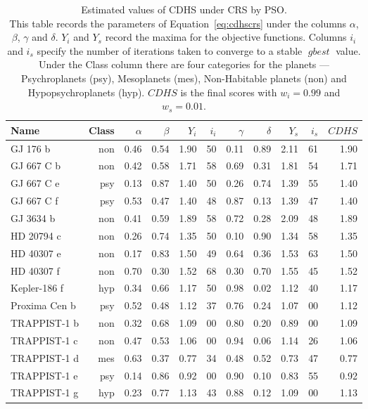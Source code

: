 \documentclass[10pt]{article}
\DeclareMathOperator*{\gbest}{\mathit{gbest}}
\begin{document}
\begin{table}
  \centering
  \begin{tabular}{l r r r r r r r r r r}
    \toprule
    Name & Class & $\alpha$ & $\beta$ & $\mathit{Y}_i$ & ${i}_i$ & 
    $\gamma$ & $\delta$ & $\mathit{Y}_s$ & ${i}_s$ & $\mathit{CDHS}$\\
    \midrule
    GJ 176 b & non & 0.46 & 0.54 & 1.90 & 50 & 0.11 & 0.89 & 2.11 & 61 & 1.90\\
    GJ 667 C b & non & 0.42 & 0.58 & 1.71 & 58 & 0.69 & 0.31 & 1.81 & 54 & 1.71\\
    GJ 667 C e & psy & 0.13 & 0.87 & 1.40 & 50 & 0.26 & 0.74 & 1.39 & 55 & 1.40\\
    GJ 667 C f & psy & 0.53 & 0.47 & 1.40 & 48 & 0.87 & 0.13 & 1.39 & 47 & 1.40\\
    GJ 3634 b & non & 0.41 & 0.59 & 1.89 & 58 & 0.72 & 0.28 & 2.09 & 48 & 1.89\\
    HD 20794 c & non & 0.26 & 0.74 & 1.35 & 50 & 0.10 & 0.90 & 1.34 & 58 & 1.35\\
    HD 40307 e & non & 0.17 & 0.83 & 1.50 & 49 & 0.64 & 0.36 & 1.53 & 63 & 1.50\\
    HD 40307 f & non & 0.70 & 0.30 & 1.52 & 68 & 0.30 & 0.70 & 1.55 & 45 & 1.52\\
    Kepler-186 f & hyp & 0.34 & 0.66 & 1.17 & 50 & 0.98 & 0.02 & 1.12 & 40 & 1.17\\
    Proxima Cen b & psy & 0.52 & 0.48 & 1.12 & 37 & 0.76 & 0.24 & 1.07 & 00 & 1.12\\
    TRAPPIST-1 b & non & 0.32 & 0.68 & 1.09 & 00 & 0.80 & 0.20 & 0.89 & 00 & 1.09\\
    TRAPPIST-1 c & non & 0.47 & 0.53 & 1.06 & 00 & 0.94 & 0.06 & 1.14 & 26 & 1.06\\
    TRAPPIST-1 d & mes & 0.63 & 0.37 & 0.77 & 34 & 0.48 & 0.52 & 0.73 & 47 & 0.77\\
    TRAPPIST-1 e & psy & 0.14 & 0.86 & 0.92 & 00 & 0.90 & 0.10 & 0.83 & 55 & 0.92\\
    TRAPPIST-1 g & hyp & 0.23 & 0.77 & 1.13 & 43 & 0.88 & 0.12 & 1.09 & 00 & 1.13\\
    \bottomrule
  \end{tabular}
  \caption{Estimated values of CDHS under CRS by PSO.\\
    \footnotesize This table records the parameters of Equation~\ref{eq:cdhscrs} under the columns
    $\alpha$, $\beta$, $\gamma$ and $\delta$. $Y_i$ and $Y_s$ record the maxima for the objective functions. Columns $i_i$
    and $i_s$ specify the number of iterations taken to converge to a stable $\gbest$ value. Under the Class column
    there are four categories for the planets --- Psychroplanets (psy), Mesoplanets (mes), Non-Habitable planets (non)
    and Hypopsychroplanets (hyp). $\mathit{CDHS}$ is the final scores with $w_i=0.99$ and
    $w_s=0.01$.}\label{tab:cdhscrs}
\end{table}
\end{document}
